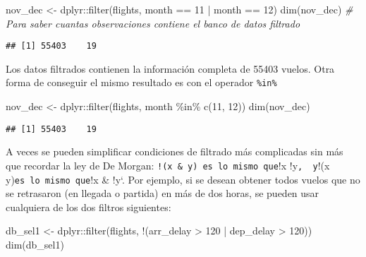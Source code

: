 \documentclass[
]{book}
\newenvironment{Shaded}{\begin{snugshade}}{\end{snugshade}}
\newcommand{\CommentTok}[1]{\textcolor[rgb]{0.56,0.35,0.01}{\textit{#1}}}
\newcommand{\DecValTok}[1]{\textcolor[rgb]{0.00,0.00,0.81}{#1}}
\newcommand{\FunctionTok}[1]{\textcolor[rgb]{0.00,0.00,0.00}{#1}}
\newcommand{\NormalTok}[1]{#1}
\newcommand{\OtherTok}[1]{\textcolor[rgb]{0.56,0.35,0.01}{#1}}
\newcommand{\SpecialCharTok}[1]{\textcolor[rgb]{0.00,0.00,0.00}{#1}}
\begin{document}
\begin{Shaded}
\begin{Highlighting}[]
\NormalTok{nov\_dec }\OtherTok{\textless{}{-}}\NormalTok{ dplyr}\SpecialCharTok{::}\FunctionTok{filter}\NormalTok{(flights, month }\SpecialCharTok{==} \DecValTok{11} \SpecialCharTok{|}\NormalTok{ month }\SpecialCharTok{==} \DecValTok{12}\NormalTok{)}
\FunctionTok{dim}\NormalTok{(nov\_dec) }\CommentTok{\# Para saber cuantas observaciones contiene el banco de datos filtrado }
\end{Highlighting}
\end{Shaded}

\begin{verbatim}
## [1] 55403    19
\end{verbatim}

Los datos filtrados contienen la información completa de 55403 vuelos. Otra forma de conseguir el mismo resultado es con el operador \texttt{\%in\%}

\begin{Shaded}
\begin{Highlighting}[]
\NormalTok{nov\_dec }\OtherTok{\textless{}{-}}\NormalTok{ dplyr}\SpecialCharTok{::}\FunctionTok{filter}\NormalTok{(flights, month }\SpecialCharTok{\%in\%} \FunctionTok{c}\NormalTok{(}\DecValTok{11}\NormalTok{, }\DecValTok{12}\NormalTok{))}
\FunctionTok{dim}\NormalTok{(nov\_dec)}
\end{Highlighting}
\end{Shaded}

\begin{verbatim}
## [1] 55403    19
\end{verbatim}

A veces se pueden simplificar condiciones de filtrado más complicadas sin más que recordar la ley de De Morgan: \texttt{!(x\ \&\ y)\ es\ lo\ mismo\ que}!x \textbar{} !y\texttt{,\ \ y}!(x \textbar{} y)\texttt{es\ lo\ mismo\ que}!x \& !y`. Por ejemplo, si se desean obtener todos vuelos que no se retrasaron (en llegada o partida) en más de dos horas, se pueden usar cualquiera de los dos filtros siguientes:

\begin{Shaded}
\begin{Highlighting}[]
\NormalTok{db\_sel1 }\OtherTok{\textless{}{-}}\NormalTok{ dplyr}\SpecialCharTok{::}\FunctionTok{filter}\NormalTok{(flights, }\SpecialCharTok{!}\NormalTok{(arr\_delay }\SpecialCharTok{\textgreater{}} \DecValTok{120} \SpecialCharTok{|}\NormalTok{ dep\_delay }\SpecialCharTok{\textgreater{}} \DecValTok{120}\NormalTok{))}
\FunctionTok{dim}\NormalTok{(db\_sel1)}
\end{Highlighting}
\end{Shaded}
\end{document}
